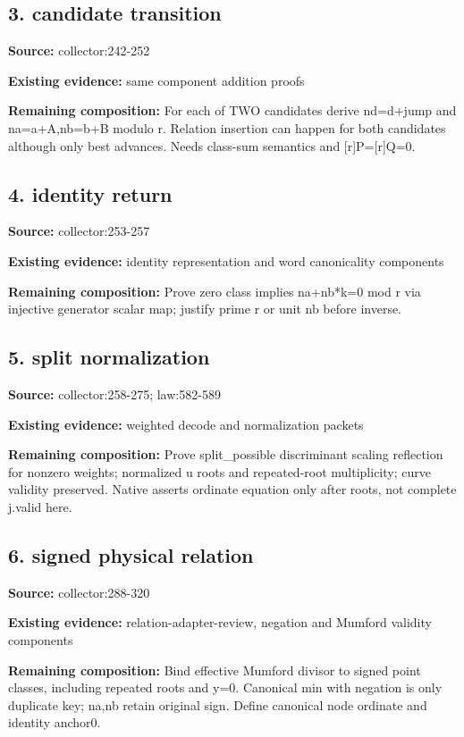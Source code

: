 \documentclass[10pt]{article}
\begin{document}
\subsection*{3. candidate transition}
\textbf{Source:} collector:242-252\par
\textbf{Existing evidence:} same component addition proofs\par
\textbf{Remaining composition:} For each of TWO candidates derive nd=d+jump and na=a+A,nb=b+B modulo r. Relation insertion can happen for both candidates although only best advances. Needs class-sum semantics and [r]P=[r]Q=0.\par
\subsection*{4. identity return}
\textbf{Source:} collector:253-257\par
\textbf{Existing evidence:} identity representation and word canonicality components\par
\textbf{Remaining composition:} Prove zero class implies na+nb*k=0 mod r via injective generator scalar map; justify prime r or unit nb before inverse.\par
\subsection*{5. split normalization}
\textbf{Source:} collector:258-275; law:582-589\par
\textbf{Existing evidence:} weighted decode and normalization packets\par
\textbf{Remaining composition:} Prove split\_possible discriminant scaling reflection for nonzero weights; normalized u roots and repeated-root multiplicity; curve validity preserved. Native asserts ordinate equation only after roots, not complete j.valid here.\par
\subsection*{6. signed physical relation}
\textbf{Source:} collector:288-320\par
\textbf{Existing evidence:} relation-adapter-review, negation and Mumford validity components\par
\textbf{Remaining composition:} Bind effective Mumford divisor to signed point classes, including repeated roots and y=0. Canonical min with negation is only duplicate key; na,nb retain original sign. Define canonical node ordinate and identity anchor0.\par
\end{document}
